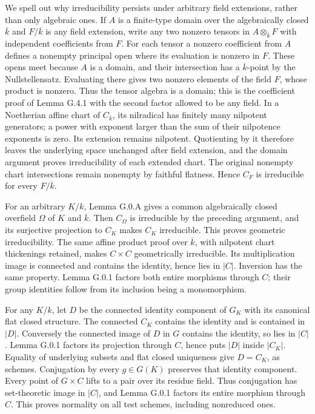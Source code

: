 \documentclass[11pt,a4paper,openany]{report}
\newcounter{none}
\begin{document}
We spell out why irreducibility persists under arbitrary field extensions, rather than only algebraic ones. If \(A\) is a finite-type domain over the algebraically closed \(\overline k\) and \(F/\overline k\) is any field extension, write any two nonzero tensors in \(A\otimes_{\overline k}F\) with independent coefficients from \(F\). For each tensor a nonzero coefficient from \(A\) defines a nonempty principal open where its evaluation is nonzero in \(F\). These opens meet because \(A\) is a domain, and their intersection has a \(\overline k\)-point by the Nullstellensatz. Evaluating there gives two nonzero elements of the field \(F\), whose product is nonzero. Thus the tensor algebra is a domain; this is the coefficient proof of Lemma G.4.1 with the second factor allowed to be any field. In a Noetherian affine chart of \(C_{\overline k}\), its nilradical has finitely many nilpotent generators; a power with exponent larger than the sum of their nilpotence exponents is zero. Its extension remains nilpotent. Quotienting by it therefore leaves the underlying space unchanged after field extension, and the domain argument proves irreducibility of each extended chart. The original nonempty chart intersections remain nonempty by faithful flatness. Hence \(C_F\) is irreducible for every \(F/\overline k\).

For an arbitrary \(K/k\), Lemma G.0.A gives a common algebraically closed overfield \(\Omega\) of \(K\) and \(\overline k\). Then \(C_\Omega\) is irreducible by the preceding argument, and its surjective projection to \(C_K\) makes \(C_K\) irreducible. This proves geometric irreducibility. The same affine product proof over \(\overline k\), with nilpotent chart thickenings retained, makes \(C\times C\) geometrically irreducible. Its multiplication image is connected and contains the identity, hence lies in \(|C|\). Inversion has the same property. Lemma G.0.1 factors both entire morphisms through \(C\); their group identities follow from its inclusion being a monomorphism.

For any \(K/k\), let \(D\) be the connected identity component of \(G_K\) with its canonical flat closed structure. The connected \(C_K\) contains the identity and is contained in \(|D|\). Conversely the connected image of \(D\) in \(G\) contains the identity, so lies in \(|C|\). Lemma G.0.1 factors its projection through \(C\), hence puts \(|D|\) inside \(|C_K|\). Equality of underlying subsets and flat closed uniqueness give \(D=C_K\), as schemes. Conjugation by every \(g\in G(K)\) preserves that identity component. Every point of \(G\times C\) lifts to a pair over its residue field. Thus conjugation has set-theoretic image in \(|C|\), and Lemma G.0.1 factors its entire morphism through \(C\). This proves normality on all test schemes, including nonreduced ones.
\end{document}
